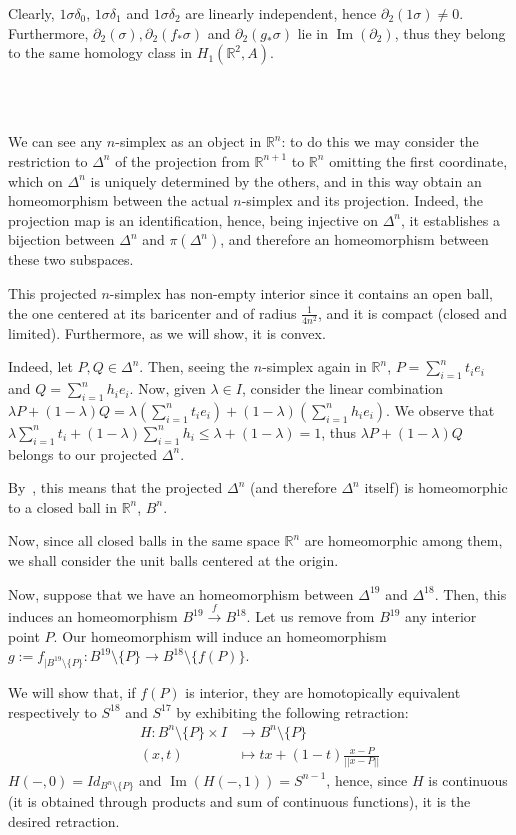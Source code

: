 \documentclass{article}
\newcommand{\numberset}{\mathbb}
\newcommand{\R}{\numberset{R}}
\DeclareMathOperator{\Ima}{Im}
\newcommand{\exercise}[1]{\noindent {\bf Exercise #1}}
\begin{document}
Clearly, $1\sigma\delta_0$, $1\sigma\delta_1$ and $1\sigma\delta_2$ are linearly independent, hence $\partial_2(1\sigma)\neq 0$. Furthermore, $\partial_2(\sigma),\partial_2(f_*\sigma)$ and $\partial_2(g_*\sigma)$ lie in $\Ima(\partial_2)$, thus they belong to the same homology class in $H_1(\R^2,A)$.

~\\
~\\
\exercise{2}

We can see any $n$-simplex as an object in $\R^n$: to do this we may consider the restriction to $\Delta^n$ of the projection from $\R^{n+1}$ to $\R^n$ omitting the first coordinate, which on $\Delta^n$ is uniquely determined by the others, and in this way obtain an homeomorphism between the actual $n$-simplex and its projection. Indeed, the projection map is an identification, hence, being injective on $\Delta^n$, it establishes a bijection between $\Delta^n$ and $\pi(\Delta^n)$, and therefore an homeomorphism between these two subspaces.

This projected $n$-simplex has non-empty interior since it contains an open ball, the one centered at its baricenter and of radius $\frac{1}{4n^2}$, and it is compact (closed and limited). Furthermore, as we will show, it is convex.

Indeed, let $P,Q\in\Delta^n$. Then, seeing the $n$-simplex again in $\R^n$, $P=\sum_{i=1}^n t_ie_i$ and $Q=\sum_{i=1}^n h_ie_i$. Now, given $\lambda\in I$, consider the linear combination $\lambda P+(1-\lambda)Q=\lambda(\sum_{i=1}^n t_ie_i)+(1-\lambda)(\sum_{i=1}^n h_ie_i)$. We observe that $\lambda\sum_{i=1}^n t_i+(1-\lambda)\sum_{i=1}^n h_i\leq \lambda+(1-\lambda)=1$, thus $\lambda P+(1-\lambda)Q$ belongs to our projected $\Delta^n$.

By~\cite[prop. 16.4]{bred}, this means that the projected $\Delta^n$ (and therefore $\Delta^n$ itself) is homeomorphic to a closed ball in $\R^n$, $B^n$.

Now, since all closed balls in the same space $\R^n$ are homeomorphic among them, we shall consider the unit balls centered at the origin.

Now, suppose that we have an homeomorphism between $\Delta^{19}$ and $\Delta^{18}$. Then, this induces an homeomorphism $B^{19}\xrightarrow{f} B^{18}$. Let us remove from $B^{19}$ any interior point $P$. Our homeomorphism will induce an homeomorphism $g:=f_{|B^{19}\setminus\{P\}}:B^{19}\setminus\{P\}\rightarrow B^{18}\setminus\{f(P)\}$.

We will show that, if $f(P)$ is interior, they are homotopically equivalent respectively to $S^{18}$ and $S^{17}$ by exhibiting the following retraction:
\begin{align*}
		H:B^n\setminus\{P\}\times I & \rightarrow B^n\setminus\{P\} \\
		(x,t) & \mapsto tx+(1-t)\frac{x-P}{||x-P||}
\end{align*}
$H(-,0)=Id_{B^n\setminus\{P\}}$ and $\Ima(H(-,1))=S^{n-1}$, hence, since $H$ is continuous (it is obtained through products and sum of continuous functions), it is the desired retraction.
\end{document}
